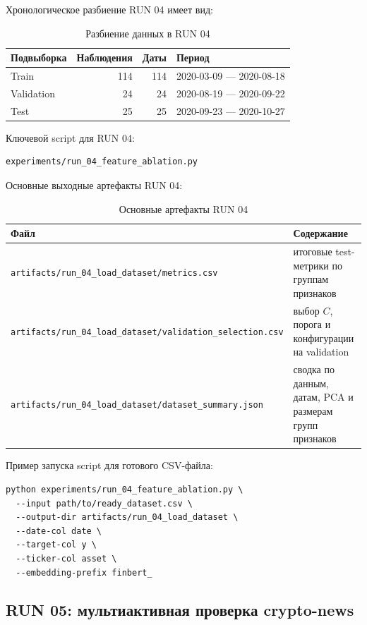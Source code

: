 Хронологическое разбиение RUN 04 имеет вид:

\begin{table}[htbp]
\centering
\begin{tabular}{lrrl}
\toprule
Подвыборка & Наблюдения & Даты & Период \\
\midrule
Train & 114 & 114 & 2020-03-09 --- 2020-08-18 \\
Validation & 24 & 24 & 2020-08-19 --- 2020-09-22 \\
Test & 25 & 25 & 2020-09-23 --- 2020-10-27 \\
\bottomrule
\end{tabular}
\caption{Разбиение данных в RUN 04}
\label{tab:appendix_run04_split}
\end{table}

Ключевой script для RUN 04:

\begin{Verbatim}[fontsize=\small]
experiments/run_04_feature_ablation.py
\end{Verbatim}

Основные выходные артефакты RUN 04:

\begin{table}[htbp]
\centering
\begin{tabular}{ll}
\toprule
Файл & Содержание \\
\midrule
\texttt{artifacts/run\_04\_load\_dataset/metrics.csv} & итоговые test-метрики по группам признаков \\
\texttt{artifacts/run\_04\_load\_dataset/validation\_selection.csv} & выбор $C$, порога и конфигурации на validation \\
\texttt{artifacts/run\_04\_load\_dataset/dataset\_summary.json} & сводка по данным, датам, PCA и размерам групп признаков \\
\bottomrule
\end{tabular}
\caption{Основные артефакты RUN 04}
\label{tab:appendix_run04_artifacts}
\end{table}

Пример запуска script для готового CSV-файла:

\begin{Verbatim}[fontsize=\small]
python experiments/run_04_feature_ablation.py \
  --input path/to/ready_dataset.csv \
  --output-dir artifacts/run_04_load_dataset \
  --date-col date \
  --target-col y \
  --ticker-col asset \
  --embedding-prefix finbert_
\end{Verbatim}

\subsection*{RUN 05: мультиактивная проверка crypto-news}

